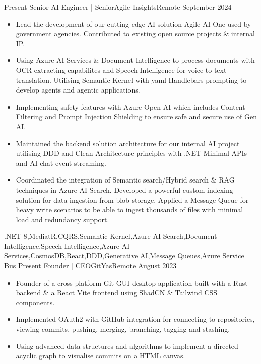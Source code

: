
\begin{experiences}
  \experience
    {Present}   {Senior AI Engineer | Senior}{Agile Insights}{Remote}
    {September 2024} {
                      \begin{itemize}
					    \item Lead the development of our cutting edge AI solution Agile AI-One used by government agencies. Contributed to existing open source projects \& internal IP.
						\item Using Azure AI Services \& Document Intelligence to process documents with OCR extracting capabilites and Speech Intelligence for voice to text translation. Utilising Semantic Kernel with yaml Handlebars prompting to develop agents and agentic applications.
						\item Implementing safety features with Azure Open AI which includes Content Filtering and Prompt Injection Shielding to ensure safe and secure use of Gen AI.
						\item Maintained the backend solution architecture for our internal AI project utilising DDD and Clean Architecture principles with .NET Minimal APIs and AI chat event streaming.
                        \item Coordinated the integration of Semantic search/Hybrid search \& RAG techniques in Azure AI Search. Developed a powerful custom indexing solution for data ingestion from blob storage. Applied a Message-Queue for heavy write scenarios to be able to ingest thousands of files with minimal load and redundancy support.
                      \end{itemize}
                    }
                    {.NET 8,MediatR,CQRS,Semantic Kernel,Azure AI Search,Document Intelligence,Speech Intelligence,Azure AI Services,CosmosDB,React,DDD,Generative AI,Message Queues,Azure Service Bus}
  \emptySeparator
\experience
    {Present}   {Founder | CEO}{GitYas}{Remote}
    {August 2023} {
                      \begin{itemize}
					    \item Founder of a cross-platform Git GUI desktop application built with a Rust backend \& a React Vite frontend using ShadCN \& Tailwind CSS components.
						\item Implemented OAuth2 with GitHub integration for connecting to repositories, viewing commits, pushing, merging, branching, tagging and stashing.
						\item Using advanced data structures and algorithms to implement a directed acyclic graph to visualise commits on a HTML canvas.

\end{itemize}}
\end{experiences}
